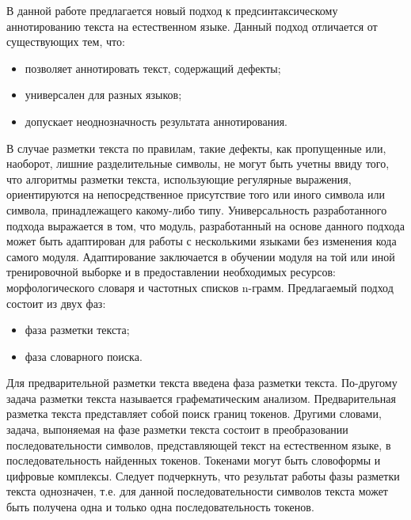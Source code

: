 В данной работе предлагается новый подход к предсинтаксическому аннотированию текста на естественном языке. Данный подход отличается от существующих тем, что: 
\begin{itemize}
\item
позволяет аннотировать текст, содержащий дефекты;
\item
универсален для разных языков;
\item
допускает неоднозначность результата аннотирования.
\end{itemize}
В случае разметки текста по правилам, такие дефекты, как пропущенные или, наоборот, лишние разделительные символы, не могут быть учетны ввиду того, что алгоритмы разметки текста, использующие регулярные выражения, ориентируются на непосредственное присутствие того или иного символа или символа, принадлежащего какому-либо типу. Универсальность разработанного подхода выражается в том, что модуль, разработанный на основе данного подхода может быть адаптирован для работы с несколькими языками без изменения кода самого модуля. Адаптирование заключается в обучении модуля на той или иной тренировочной выборке и в предоставлении необходимых ресурсов: морфологического словаря и частотных списков n-грамм.
Предлагаемый подход состоит из двух фаз:
\begin{itemize}
\item
фаза разметки текста;
\item
фаза словарного поиска.
\end{itemize}
Для предварительной разметки текста введена фаза разметки текста. По-другому задача разметки текста называется графематическим анализом. Предварительная разметка текста представляет собой поиск границ токенов. Другими словами, задача, выпоняемая на фазе разметки текста состоит в преобразовании последовательности символов, представляющей текст на естественном языке, в последовательность найденных токенов. Токенами могут быть словоформы и цифровые комплексы. Следует подчеркнуть, что результат работы фазы разметки текста однозначен, т.е. для данной последовательности символов текста может быть получена одна и только одна последовательность токенов. 

